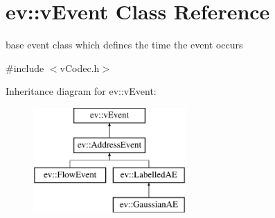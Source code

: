 \hypertarget{classev_1_1vEvent}{}\section{ev\+:\+:v\+Event Class Reference}
\label{classev_1_1vEvent}


base event class which defines the time the event occurs  




{\ttfamily \#include $<$v\+Codec.\+h$>$}

Inheritance diagram for ev\+:\+:v\+Event\+:\begin{figure}[H]
\begin{center}
\leavevmode
\includegraphics[height=4.000000cm]{classev_1_1vEvent}
\end{center}
\end{figure}

